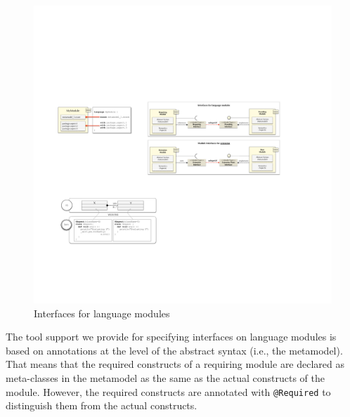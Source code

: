 \begin{figure}
\centering
\includegraphics[width=1\linewidth]{images/approach-interfaces.pdf}
\caption{Interfaces for language modules}
\label{fig:approaches-interfaces}
\end{figure}

The tool support we provide for specifying interfaces on language modules is based on annotations at the level of the abstract syntax (i.e., the metamodel). That means that the required constructs of a requiring module are declared as meta-classes in the metamodel as the same as the actual constructs of the module. However, the required constructs are annotated with \texttt{@Required} to distinguish them from the actual constructs.